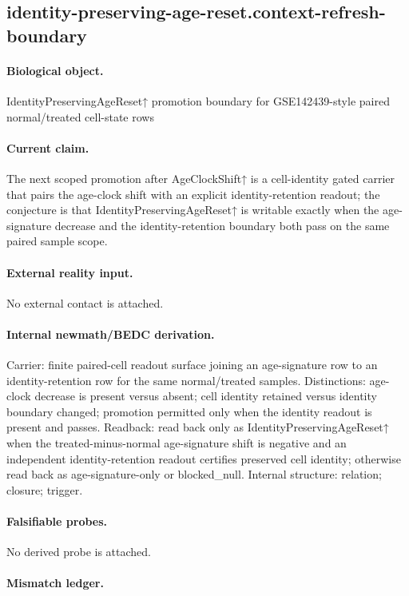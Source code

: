 \subsection{identity-preserving-age-reset.context-refresh-boundary}

\paragraph{Biological object.} IdentityPreservingAgeReset↑ promotion boundary for GSE142439-style paired normal/treated cell-state rows

\paragraph{Current claim.} The next scoped promotion after AgeClockShift↑ is a cell-identity gated carrier that pairs the age-clock shift with an explicit identity-retention readout; the conjecture is that IdentityPreservingAgeReset↑ is writable exactly when the age-signature decrease and the identity-retention boundary both pass on the same paired sample scope.

\paragraph{External reality input.}
No external contact is attached.

\paragraph{Internal newmath/BEDC derivation.} Carrier: finite paired-cell readout surface joining an age-signature row to an identity-retention row for the same normal/treated samples. Distinctions: age-clock decrease is present versus absent; cell identity retained versus identity boundary changed; promotion permitted only when the identity readout is present and passes. Readback: read back only as IdentityPreservingAgeReset↑ when the treated-minus-normal age-signature shift is negative and an independent identity-retention readout certifies preserved cell identity; otherwise read back as age-signature-only or blocked\_null. Internal structure: relation; closure; trigger.

\paragraph{Falsifiable probes.}
No derived probe is attached.

\paragraph{Mismatch ledger.}

